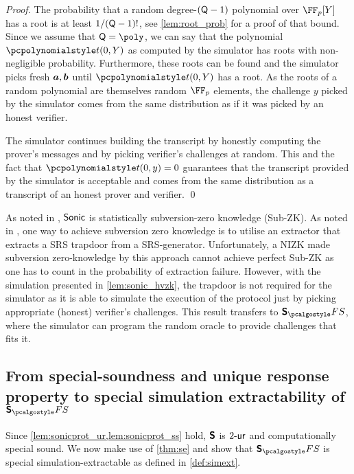 \documentclass[runningheads,11pt]{llncs}
\let\spvec\vec
\let\vec\accentvec
\let\spvec\vec
\let\vec\spvec
\def\vec#1{\mathchoice{\mbox{\boldmath$\displaystyle#1$}}
  {\mbox{\boldmath$\textstyle#1$}} {\mbox{\boldmath$\scriptstyle#1$}}
  {\mbox{\boldmath$\scriptscriptstyle#1$}}}
\begin{document}
\begin{proof}
The probability that a random degree-$(\mathsf{Q} - 1)$ polynomial over
$\FF_p[Y]$ has a root is at least $1 / (\mathsf{Q} - 1) !$, see
\cref{lem:root_prob} for a proof of that bound. Since we assume that $\linconstr
= \poly$, we can say that the polynomial $\pt(0,Y)$ as computed by the simulator
has roots with non-negligible probability. Furthermore, these roots can be found
and the simulator picks fresh $\vec{a}, \vec{b}$ until $\pt(0,Y)$ has a root. As
the roots of a random polynomial are themselves random $\FF_p$ elements, the
challenge $y$ picked by the simulator comes from the same distribution as if it
was picked by an honest verifier.

The simulator continues building the transcript by honestly computing the
prover's messages and by picking verifier's challenges at random. This and the
fact that $\pt(0,y) = 0$ guarantees that the transcript provided by the simulator is
acceptable and comes from the same distribution as a transcript of an honest
prover and verifier. \qed
\end{proof}

\begin{remark} 
  As noted in \cite{CCS:MBKM19}, ${\textnormal{\textsf{Sonic}}}$ is statistically subversion-zero
  knowledge (Sub-ZK). As noted in \cite{AC:ABLZ17}, one way to achieve
  subversion zero knowledge is to utilise an extractor that extracts a SRS
  trapdoor from a SRS-generator. Unfortunately, a NIZK made subversion
  zero-knowledge by this approach cannot achieve perfect Sub-ZK as one has to
  count in the probability of extraction failure. However, with the simulation
  presented in \cref{lem:sonic_hvzk}, the trapdoor is not required for the
  simulator as it is able to simulate the execution of the protocol just by
  picking appropriate (honest) verifier's challenges. This result transfers to
  $\sonicprotfs$, where the simulator can program the random oracle to provide
  challenges that fits it.
\end{remark}

\subsection{From special-soundness and unique response property to special simulation extractability of $\sonicprotfs$}
Since \cref{lem:sonicprot_ur,lem:sonicprot_ss} hold, $\bm{\mathsf{S}}$ is ${2\text{-}\mathsf{ur}}$
and computationally special sound. We now make use
of \cref{thm:se} and show that $\sonicprotfs$ is special simulation-extractable as defined in \cref{def:simext}.
\end{document}
